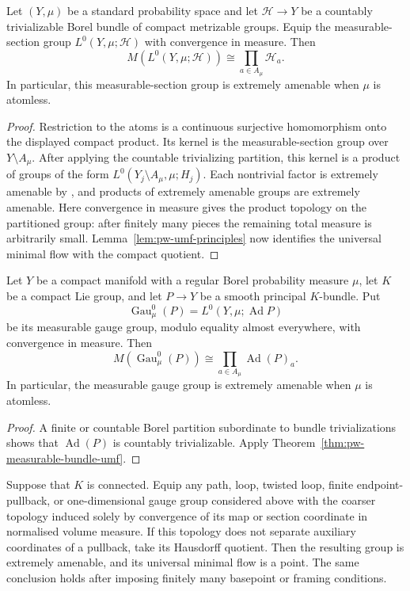 \begin{theorem}\label{thm:pw-measurable-bundle-umf}
Let \((Y,\mu)\) be a standard probability space and let
\(\mathcal H\to Y\) be a countably trivializable Borel bundle of compact
metrizable groups.  Equip the measurable-section group
\(L^0(Y,\mu;\mathcal H)\) with convergence in measure. Then
\[
M(L^0(Y,\mu;\mathcal H))
 \cong\prod_{a\in A_\mu}\mathcal H_a.
\]
In particular, this measurable-section group is extremely amenable when
\(\mu\) is atomless.
\end{theorem}

\begin{proof}
Restriction to the atoms is a continuous surjective homomorphism onto the
displayed compact product. Its kernel is the measurable-section group over
\(Y\setminus A_\mu\). After applying the countable trivializing partition,
this kernel is a product of groups of the form
\(L^0(Y_j\setminus A_\mu,\mu;H_j)\). Each nontrivial factor is extremely
amenable by \cite[Theorem~1.1]{PestovSchneider2017}, and products of extremely amenable
groups are extremely amenable. Here convergence in measure gives the product
topology on the partitioned group: after finitely many pieces the remaining
total measure is arbitrarily small. Lemma~\ref{lem:pw-umf-principles} now
identifies the universal minimal flow with the compact quotient.
\end{proof}

\begin{corollary}\label{cor:pw-measurable-gauge-umf}
Let \(Y\) be a compact manifold with a regular Borel probability measure
\(\mu\), let \(K\) be a compact Lie group, and let \(P\to Y\) be a smooth
principal \(K\)-bundle.  Put
\[
\operatorname{Gau}^0_\mu(P)=L^0(Y,\mu;\operatorname{Ad}P)
\]
be its measurable gauge group, modulo equality almost everywhere, with
convergence in measure. Then
\[
M(\operatorname{Gau}^0_\mu(P))
\cong\prod_{a\in A_\mu}\operatorname{Ad}(P)_a.
\]
In particular, the measurable gauge group is extremely amenable when
\(\mu\) is atomless.
\end{corollary}

\begin{proof}
A finite or countable Borel partition subordinate to bundle trivializations
shows that \(\operatorname{Ad}(P)\) is countably trivializable. Apply
Theorem~\ref{thm:pw-measurable-bundle-umf}.
\end{proof}

\begin{corollary}\label{cor:pw-measure-topology-umf}
Suppose that \(K\) is connected. Equip any path, loop, twisted loop, finite
endpoint-pullback, or one-dimensional gauge group considered above with the
coarser topology induced solely by convergence of its map or section
coordinate in normalised volume measure. If this topology does not separate
auxiliary coordinates of a pullback, take its Hausdorff quotient. Then the
resulting group is extremely amenable, and its universal minimal flow is a
point. The same conclusion holds after imposing finitely many basepoint or
framing conditions.
\end{corollary}

